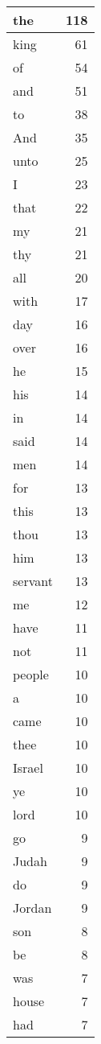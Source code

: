 \begin{center}
\begin{longtable}{l|r}
\hline \hline
\endlastfoot
the & 118 \\ \hline
king & 61 \\ \hline
of & 54 \\ \hline
and & 51 \\ \hline
to & 38 \\ \hline
And & 35 \\ \hline
unto & 25 \\ \hline
I & 23 \\ \hline
that & 22 \\ \hline
my & 21 \\ \hline
thy & 21 \\ \hline
all & 20 \\ \hline
with & 17 \\ \hline
day & 16 \\ \hline
over & 16 \\ \hline
he & 15 \\ \hline
his & 14 \\ \hline
in & 14 \\ \hline
said & 14 \\ \hline
men & 14 \\ \hline
for & 13 \\ \hline
this & 13 \\ \hline
thou & 13 \\ \hline
him & 13 \\ \hline
servant & 13 \\ \hline
me & 12 \\ \hline
have & 11 \\ \hline
not & 11 \\ \hline
people & 10 \\ \hline
a & 10 \\ \hline
came & 10 \\ \hline
thee & 10 \\ \hline
Israel & 10 \\ \hline
ye & 10 \\ \hline
lord & 10 \\ \hline
go & 9 \\ \hline
Judah & 9 \\ \hline
do & 9 \\ \hline
Jordan & 9 \\ \hline
son & 8 \\ \hline
be & 8 \\ \hline
was & 7 \\ \hline
house & 7 \\ \hline
had & 7 \\ \hline

\end{longtable}
\end{center}
